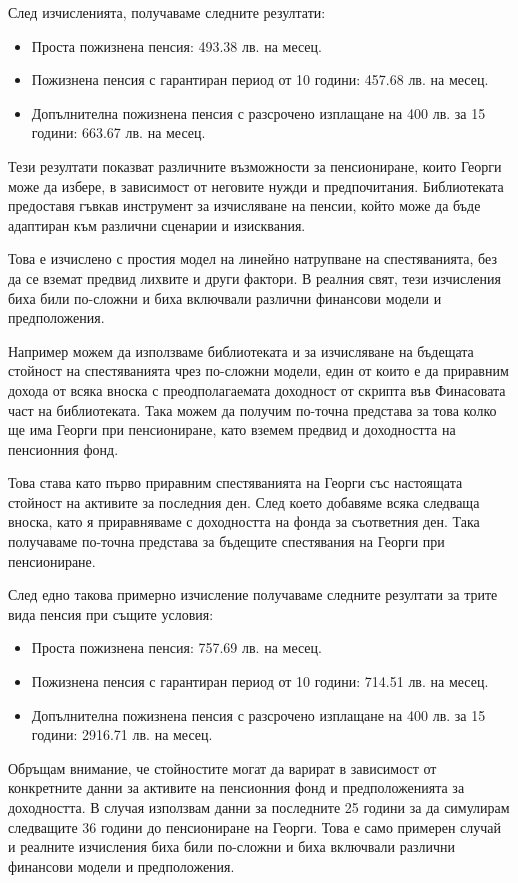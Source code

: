 \documentclass[a4paper,12pt]{article}
\begin{document}
След изчисленията, получаваме следните резултати:
\begin{itemize}
        \item Проста пожизнена пенсия: 493.38 лв. на месец.
        \item Пожизнена пенсия с гарантиран период от 10 години: 457.68 лв. на месец.
        \item Допълнителна пожизнена пенсия с разсрочено изплащане на 400 лв. за 15 години: 663.67 лв. на месец.
\end{itemize}

Тези резултати показват различните възможности за пенсиониране, които Георги може да избере, в зависимост от неговите нужди и предпочитания. Библиотеката предоставя гъвкав инструмент за изчисляване на пенсии, който може да бъде адаптиран към различни сценарии и изисквания.

Това е изчислено с простия модел на линейно натрупване на спестяванията, без да се вземат предвид лихвите и други фактори. В реалния свят, тези изчисления биха били по-сложни и биха включвали различни финансови модели и предположения.

Например можем да използваме библиотеката и за изчисляване на бъдещата стойност на спестяванията чрез по-сложни модели, един от които е да приравним дохода от всяка вноска с преодполагаемата доходност от скрипта във Финасовата част на библиотеката. Така можем да получим по-точна представа за това колко ще има Георги при пенсиониране, като вземем предвид и доходността на пенсионния фонд.

Това става като първо приравним спестяванията на Георги със настоящата стойност на активите за последния ден. След което добавяме всяка следваща вноска, като я приравняваме с доходността на фонда за съответния ден. Така получаваме по-точна представа за бъдещите спестявания на Георги при пенсиониране.

След едно такова примерно изчисление получаваме следните резултати за трите вида пенсия при същите условия:
\begin{itemize}
        \item Проста пожизнена пенсия: 757.69 лв. на месец.
        \item Пожизнена пенсия с гарантиран период от 10 години: 714.51 лв. на месец.
        \item Допълнителна пожизнена пенсия с разсрочено изплащане на 400 лв. за 15 години: 2916.71 лв. на месец.
\end{itemize}

Обръщам внимание, че стойностите могат да варират в зависимост от конкретните данни за активите на пенсионния фонд и предположенията за доходността. В случая използвам данни за последните 25 години за да симулирам следващите 36 години до пенсиониране на Георги. Това е само примерен случай и реалните изчисления биха били по-сложни и биха включвали различни финансови модели и предположения.
\end{document}

